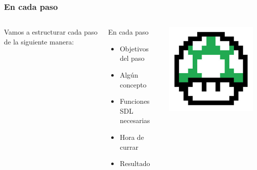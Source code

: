 \begin{frame}[fragile]
	\frametitle{En cada paso}
    
    \begin{columns}[c]
	\column{175pt}

	\begin{center}
	    Vamos a estructurar cada paso de la siguiente manera:
	\end{center}
	
	\begin{block}{En cada paso}
	    \begin{itemize}
		\item Objetivos del paso
		\item Algún concepto
		\item Funciones SDL necesarias
		\item Hora de currar
		\item Resultado
	    \end{itemize}
	\end{block}
	
	\column{125pt}
	\begin{center}
		\includegraphics[scale=0.3]{img/1up.jpg}
	\end{center}	
	
    \end{columns}

\end{frame}

